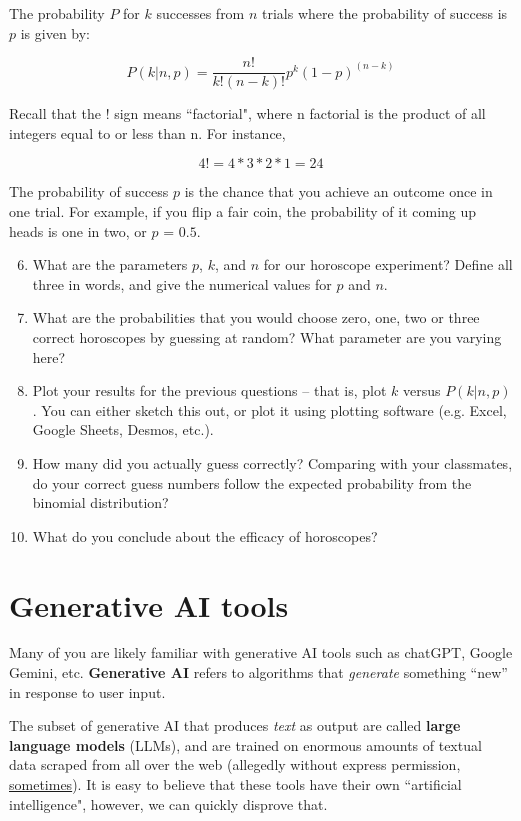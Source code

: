 \documentclass[12pt]{article}
\begin{document}
The probability $P$ for $k$ successes from $n$ trials where the probability of success is $p$ is given by:

\[P(k|n,p) = \frac{n!}{k!(n-k)!}p^{k}(1-p)^{(n-k)}\]

\vspace{1mm}
\noindent Recall that the ! sign means ``factorial", where n factorial is the product of all integers equal to or less than n. For instance, 

\[4! = 4*3*2*1 = 24\]

\noindent The probability of success $p$ is the chance that you achieve an outcome once in one trial. For example, if you flip a fair coin, the probability of it coming up heads is one in two, or $p$ = $0.5$. \\

\noindent 
\begin{enumerate}
\setcounter{enumi}{5}
\item What are the parameters $p$, $k$, and $n$ for our horoscope experiment? Define all three in words, and give the numerical values for $p$ and $n$. %
\item What are the probabilities that you would choose zero, one, two or three correct horoscopes by guessing at random? What parameter are you varying here? 
\item Plot your results for the previous questions -- that is, plot $k$ versus $P(k|n,p)$. You can either sketch this out, or plot it using plotting software (e.g. Excel, Google Sheets, Desmos, etc.).
\item How many did you actually guess correctly? Comparing with your classmates, do your correct guess numbers follow the expected probability from the binomial distribution? 
\item What do you conclude about the efficacy of horoscopes?
\end{enumerate}

\section{Generative AI tools}

Many of you are likely familiar with generative AI tools such as chatGPT, Google Gemini, etc. \textbf{Generative AI} refers to algorithms that \textit{generate} something ``new'' in response to user input.

The subset of generative AI that produces \textit{text} as output are called \textbf{large language models} (LLMs), and are trained on enormous amounts of textual data scraped from all over the web (allegedly without express permission, \href{https://www.nytimes.com/2023/12/27/business/media/new-york-times-open-ai-microsoft-lawsuit.html}{sometimes}). It is easy to believe that these tools have their own ``artificial intelligence", however, we can quickly disprove that.
\end{document}
